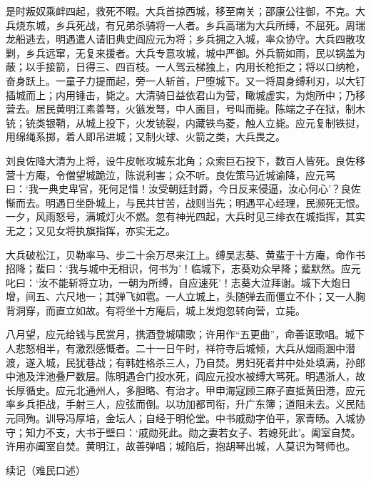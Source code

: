 \documentclass[]{article}
\begin{document}
是时叛奴乘衅四起，救死不暇。大兵首掠西城，移至南关；邵康公往御，不克。大兵烧东城，乡兵死战，有兄弟杀骑将一人者。乡兵高瑞为大兵所缚，不屈死。周瑞龙船逃去，明遇遣人请旧典史阎应元为将；乡兵拥之入城，率众协守。大兵四散攻剿，乡兵远窜，无复来援者。大兵专意攻城，城中严御。外兵箭如雨，民以锅盖为蔽；以手接箭，日得三、四百枝。一人驾云梯独上，内用长枪拒之；将以口纳枪，奋身跃上。一童子力提而起，旁一人斩首，尸堕城下。又一将周身缚利刃，以大钉插城而上；内用锤击，毙之。大清骑日益依君山为营，瞰城虚实，为炮所中；乃移营去。居民黄明江素善弩，火镞发弩，中人面目，号叫而毙。陈端之子在狱，制木铳；铳类银鞘，从城上投下，火发铳裂，内藏铁鸟菱，触人立毙。应元复制铁挝，用绵绳系掷，着人即吊进城；又制火球、火箭之类，大兵畏之。

刘良佐降大清为上将，设牛皮帐攻城东北角；众索巨石投下，数百人皆死。良佐移营十方庵，令僧望城跪泣，陈说利害；众不听。良佐策马近城谕降，应元骂曰：`我一典史卑官，死何足惜！汝受朝廷封爵，今日反来侵逼，汝心何心'？良佐惭而去。明遇日坐卧城上，与民共甘苦，战则当先；明遇平心经理，民濒死无恨。一夕，风雨怒号，满城灯火不燃。忽有神光四起，大兵时见三绯衣在城指挥，其实无之；又见女将执旗指挥，亦实无之。

大兵破松江，贝勒率马、步二十余万尽来江上。缚吴志葵、黄蜚于十方庵，命作书招降；蜚曰：`我与城中无相识，何书为'！临城下，志葵劝众早降；蜚默然。应元叱曰：`汝不能斩将立功，一朝为所缚，自应速死'！志葵大泣拜谢。城下大炮日增，间五、六尺地一；其弹飞如雹。一人立城上，头随弹去而僵立不仆；又一人胸背洞穿，而直立如故。有将坐十方庵后，城上发炮忽转向营，立毙。

八月望，应元给钱与民赏月，携酒登城啸歌；许用作``五更曲''，命善讴歌唱。城下人悲怒相半，有激烈感慨者。二十一日午时，祥符寺后城倾，大兵从烟雨溷中潜渡，遂入城，民犹巷战；有韩姓格杀三人，乃自焚。男妇死者井中处处填满，孙郎中池及泮池叠尸数层。陈明遇合门投水死，阎应元投水被缚大骂死。明遇浙人，故长厚循史。应元北通州人，多胆略、有治才。甲申海寇顾三麻子直抵黄田港，应元率乡兵拒战，手射三人，应弦而倒。以功加都司衔，升广东簿；道阻未去。义民陆元同殉。训导冯厚培，金坛人；自经于明伦堂。中书戚勋字伯平，家青旸。入城协守；知力不支，大书于壁曰：`戚勋死此。勋之妻若女子、若媳死此'。阖室自焚。许用亦阖室自焚。黄明江，故善弹唱；城陷后，抱胡琴出城，人莫识为弩师也。

续记（难民口述）
\end{document}
